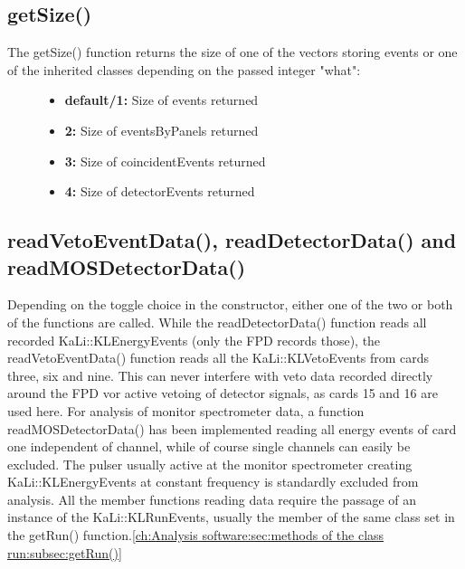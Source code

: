     \subsection{getSize()}
    \label{ch:Analysis software:sec:methods of the class run:subsec:getSize()}
    The getSize() function returns the size of one of the vectors storing events or one of the inherited classes depending on the passed integer "what":
    \begin{figure}
    	\begin{itemize}
		
    		\item {\bf default/1:} Size of events returned
    		\item {\bf 2:} Size of eventsByPanels returned
    		\item {\bf 3:} Size of coincidentEvents returned
    		\item {\bf 4:} Size of detectorEvents returned
    	\end{itemize}

    \end{figure}

    
    \subsection{readVetoEventData(), readDetectorData() and readMOSDetectorData()}
    \label{ch:Analysis software:sec:methods of the class run:subsec:readVetoEventData(), readDetectorData() and readMOSDetectorData()}
    Depending on the toggle choice in the constructor, either one of the two or both of the functions are called. While the readDetectorData() function reads all recorded KaLi::\-KLEnergy\-Events (only the FPD records those), the readVetoEventData() function reads all the KaLi::KLVetoEvents from cards three, six and nine. This can never interfere with veto data recorded directly around the FPD vor active vetoing of detector signals, as cards 15 and 16 are used here.
    For analysis of monitor spectrometer data, a function readMOSDetectorData() has been implemented reading all energy events of card one independent of channel, while of course single channels can easily be excluded. The pulser usually active at the monitor spectrometer creating KaLi::KLEnergyEvents at constant frequency is standardly excluded from analysis.
    All the member functions reading data require the passage of an instance of the KaLi::KLRunEvents, usually the member of the same class set in the getRun() function.\ref{ch:Analysis software:sec:methods of the class run:subsec:getRun()}

    
    
    
    
    
      